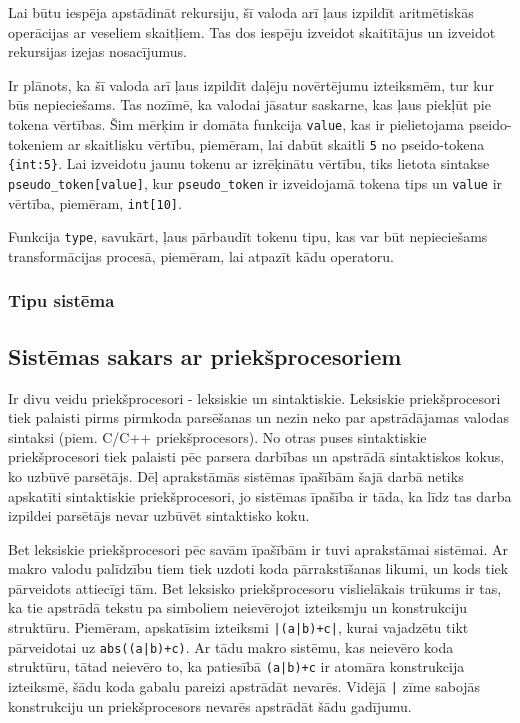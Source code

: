 
Lai būtu iespēja apstādināt rekursiju, šī valoda arī ļaus izpildīt aritmētiskās operācijas ar veseliem skaitļiem. Tas dos iespēju izveidot skaitītājus un izveidot rekursijas izejas nosacījumus.

Ir plānots, ka šī valoda arī ļaus izpildīt daļēju novērtējumu izteiksmēm, tur kur būs nepieciešams. Tas nozīmē, ka valodai jāsatur saskarne, kas ļaus piekļūt pie tokena vērtības. Šim mērķim ir domāta funkcija \verb|value|, kas ir pielietojama pseido-tokeniem ar skaitlisku vērtību, piemēram, lai dabūt skaitli \verb|5| no pseido-tokena \verb|{int:5}|. Lai izveidotu jaunu tokenu ar izrēķinātu vērtību, tiks lietota sintakse \verb|pseudo_token[value]|, kur \verb|pseudo_token| ir izveidojamā tokena tips un \verb|value| ir vērtība, piemēram, \verb|int[10]|.

Funkcija \verb|type|, savukārt, ļaus pārbaudīt tokenu tipu, kas var būt nepieciešams transformācijas procesā, piemēram, lai atpazīt kādu operatoru.

\subsubsection{Tipu sistēma}


\subsection{Sistēmas sakars ar priekšprocesoriem}
Ir divu veidu priekšprocesori - leksiskie un sintaktiskie. Leksiskie priekšprocesori tiek palaisti pirms pirmkoda parsēšanas un nezin neko par apstrādājamas valodas sintaksi (piem. C/C++ priekšprocesors). No otras puses sintaktiskie priekšprocesori tiek palaisti pēc parsera darbības un apstrādā sintaktiskos kokus, ko uzbūvē parsētājs. Dēļ aprakstāmās sistēmas īpašībām šajā darbā netiks apskatīti sintaktiskie priekšprocesori, jo sistēmas īpašība ir tāda, ka līdz tas darba izpildei parsētājs nevar uzbūvēt sintaktisko koku.

Bet leksiskie priekšprocesori pēc savām īpašībām ir tuvi aprakstāmai sistēmai. Ar makro valodu palīdzību tiem tiek uzdoti koda pārrakstīšanas likumi, un kods tiek pārveidots attiecīgi tām. Bet leksisko priekšprocesoru vislielākais trūkums ir tas, ka tie apstrādā tekstu pa simboliem neievērojot izteiksmju un konstrukciju struktūru. Piemēram, apskatīsim izteiksmi \verb/|(a|b)+c|/, kurai vajadzētu tikt pārveidotai uz \verb/abs((a|b)+c)/. Ar tādu makro sistēmu, kas neievēro koda struktūru, tātad neievēro to, ka patiesībā \verb/(a|b)+c/ ir atomāra konstrukcija izteiksmē, šādu koda gabalu pareizi apstrādāt nevarēs. Vidējā \verb/|/ zīme sabojās konstrukciju un priekšprocesors nevarēs apstrādāt šādu gadījumu.


